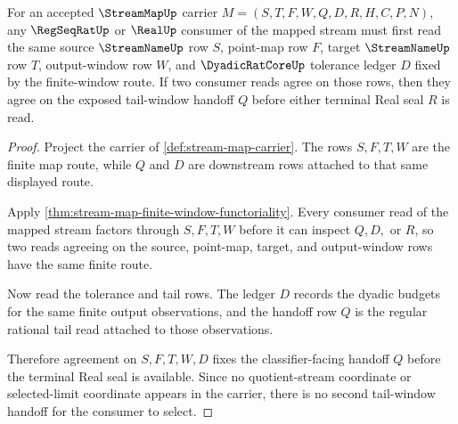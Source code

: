 \begin{theorem}
\label{thm:stream-map-tail-window-determinacy}
For an accepted $\StreamMapUp$ carrier $M=(S,T,F,W,Q,D,R,H,C,P,N)$, any $\RegSeqRatUp$ or $\RealUp$ consumer of the mapped stream must first read the same source $\StreamNameUp$ row $S$, point-map row $F$, target $\StreamNameUp$ row $T$, output-window row $W$, and $\DyadicRatCoreUp$ tolerance ledger $D$ fixed by the finite-window route. If two consumer reads agree on those rows, then they agree on the exposed tail-window handoff $Q$ before either terminal Real seal $R$ is read.
\end{theorem}
\begin{proof}
Project the carrier of \autoref{def:stream-map-carrier}. The rows $S,F,T,W$ are the finite map route, while $Q$ and $D$ are downstream rows attached to that same displayed route.

Apply \autoref{thm:stream-map-finite-window-functoriality}. Every consumer read of the mapped stream factors through $S,F,T,W$ before it can inspect $Q,D,$ or $R$, so two reads agreeing on the source, point-map, target, and output-window rows have the same finite route.

Now read the tolerance and tail rows. The ledger $D$ records the dyadic budgets for the same finite output observations, and the handoff row $Q$ is the regular rational tail read attached to those observations.

Therefore agreement on $S,F,T,W,D$ fixes the classifier-facing handoff $Q$ before the terminal Real seal is available. Since no quotient-stream coordinate or selected-limit coordinate appears in the carrier, there is no second tail-window handoff for the consumer to select.
\end{proof}

